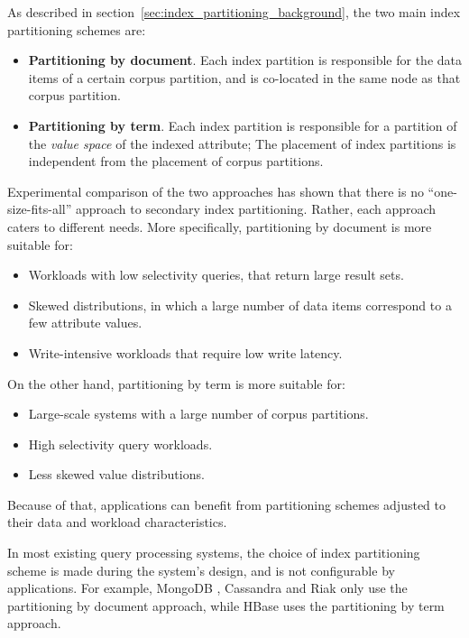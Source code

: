 As described in section~\ref{sec:index_partitioning_background}, the two main index partitioning schemes are:
\begin{itemize}
  \item \textbf{Partitioning by document}.
  Each index partition is responsible for the data items of a certain corpus partition,
  and is co-located in the same node as that corpus partition.
  \item \textbf{Partitioning by term}.
  Each index partition is responsible for a partition of the \textit{value space} of the indexed attribute;
  The placement of index partitions is independent from the placement of corpus partitions.
\end{itemize}

Experimental comparison of the two approaches \cite{dsilva:tworings, kejriwal:slik} has shown that there is no ``one-size-fits-all'' approach to secondary index partitioning.
Rather, each approach caters to different needs.
More specifically, partitioning by document is more suitable for:
\begin{itemize}
  \item Workloads with low selectivity queries, that return large result sets.
  \item Skewed distributions, in which a large number of data items correspond to a few attribute values.
  \item Write-intensive workloads that require low write latency.
\end{itemize}
\noindent
On the other hand, partitioning by term is more suitable for:
\begin{itemize}
  \item Large-scale systems with a large number of corpus partitions.
  \item High selectivity query workloads.
  \item Less skewed value distributions.
\end{itemize}

Because of that, applications can benefit from partitioning schemes adjusted to their data and workload characteristics.

In most existing query processing systems,
the choice of index partitioning scheme is made during the system's design, and is not configurable
by applications.
For example, MongoDB \cite{coubase:mongoindexes}, Cassandra \cite{cassandra:secondaryindexing} and Riak \cite{riakv:secondaryindexes}
only use the partitioning by document approach,
while HBase \cite{hbase:secondaryindexes} uses the partitioning by term approach.

